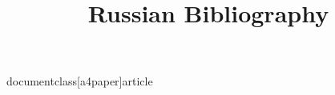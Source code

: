 documentclass[a4paper]{article}

\usepackage[T2A]{fontenc}
\usepackage[utf8]{inputenc}
\usepackage[english, russian]{babel}
\usepackage{cmap}

\usepackage[letterpaper,top=2cm,bottom=2cm,left=3cm,right=3cm,marginparwidth=1.75cm]{geometry}

\usepackage{amsmath}
\usepackage{graphicx}
\usepackage[colorlinks=true, allcolors=blue]{hyperref}

\title{Russian Bibliography}



\nocite{*}



